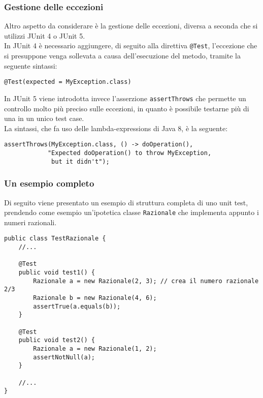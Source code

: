 \subsubsection{Gestione delle eccezioni}
Altro aspetto da considerare è la gestione delle eccezioni, diversa a seconda che si utilizzi JUnit 4 o JUnit 5.\\

In JUnit 4 è necessario aggiungere, di seguito alla direttiva \texttt{@Test}, l'eccezione che si presuppone venga sollevata a causa dell'esecuzione del metodo, tramite la seguente sintassi:
\begin{verbatim}
@Test(expected = MyException.class)

\end{verbatim}

In JUnit 5 viene introdotta invece l'asserzione \texttt{assertThrows} che permette un controllo molto più preciso sulle eccezioni, in quanto è possibile testarne più di una in un unico test case.\\
La sintassi, che fa uso delle lambda-expressions di Java 8, è la seguente:
\begin{verbatim}
assertThrows(MyException.class, () -> doOperation(),
            "Expected doOperation() to throw MyException,
             but it didn't");
\end{verbatim}

\subsubsection{Un esempio completo}
Di seguito viene presentato un esempio di struttura completa di uno unit test, prendendo come esempio un'ipotetica classe \texttt{Razionale} che implementa appunto i numeri razionali.\\

\begin{lstlisting}
public class TestRazionale {
	//...
	
	@Test
	public void test1() {
		Razionale a = new Razionale(2, 3); // crea il numero razionale 2/3
		Razionale b = new Razionale(4, 6);
		assertTrue(a.equals(b));
	}
	
	@Test
	public void test2() {
		Razionale a = new Razionale(1, 2);
		assertNotNull(a);
	}
	
	//... 
}
\end{lstlisting}

\newpage
\thispagestyle{empty}
\mbox{}


